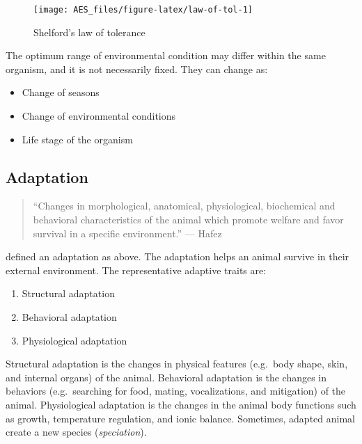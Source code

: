 \documentclass[]{book}
\providecommand{\tightlist}{%
  \setlength{\itemsep}{0pt}\setlength{\parskip}{0pt}}
\begin{document}
\begin{figure}

\texttt{[image: AES\_files/figure-latex/law-of-tol-1]} \hfill{}

\caption{Shelford's law of tolerance}\label{fig:law-of-tol}
\end{figure}

The optimum range of environmental condition may differ within the same organism, and it is not necessarily fixed. They can change as:

\begin{itemize}
\tightlist
\item
  Change of seasons
\item
  Change of environmental conditions
\item
  Life stage of the organism
\end{itemize}

\hypertarget{adaptation}{%
\subsection{Adaptation}\label{adaptation}}

\begin{quote}
``Changes in morphological, anatomical, physiological, biochemical and behavioral characteristics of the animal which promote welfare and favor survival in a specific environment.'' --- Hafez
\end{quote}

\citet{hafez1968adaptation} defined an adaptation as above. The adaptation helps an animal survive in their external environment. The representative adaptive traits are:

\begin{enumerate}
\def\labelenumi{\arabic{enumi}.}
\tightlist
\item
  Structural adaptation
\item
  Behavioral adaptation
\item
  Physiological adaptation
\end{enumerate}

Structural adaptation is the changes in physical features (e.g.~body shape, skin, and internal organs) of the animal. Behavioral adaptation is the changes in behaviors (e.g.~searching for food, mating, vocalizations, and mitigation) of the animal. Physiological adaptation is the changes in the animal body functions such as growth, temperature regulation, and ionic balance. Sometimes, adapted animal create a new species (\emph{speciation}).
\end{document}

